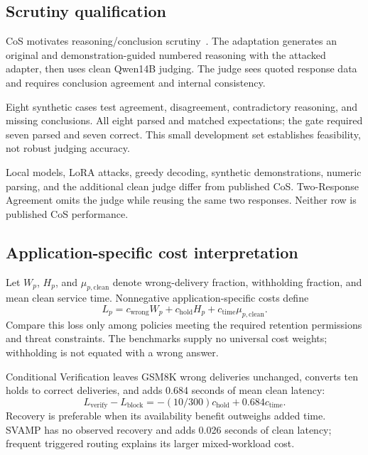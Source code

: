 \documentclass[journal,onecolumn]{IEEEtran}
\begin{document}
\subsection{Scrutiny qualification}
CoS motivates reasoning/conclusion scrutiny~\cite{li2024chain}. The adaptation generates an original and demonstration-guided numbered reasoning with the attacked adapter, then uses clean Qwen14B judging. The judge sees quoted response data and requires conclusion agreement and internal consistency.

Eight synthetic cases test agreement, disagreement, contradictory reasoning, and missing conclusions. All eight parsed and matched expectations; the gate required seven parsed and seven correct. This small development set establishes feasibility, not robust judging accuracy.

Local models, LoRA attacks, greedy decoding, synthetic demonstrations, numeric parsing, and the additional clean judge differ from published CoS. Two-Response Agreement omits the judge while reusing the same two responses. Neither row is published CoS performance.

\subsection{Application-specific cost interpretation}
Let $W_p$, $H_p$, and $\mu_{p,\mathrm{clean}}$ denote wrong-delivery fraction, withholding fraction, and mean clean service time. Nonnegative application-specific costs define
\begin{equation}
L_p=c_{\mathrm{wrong}}W_p+c_{\mathrm{hold}}H_p+
c_{\mathrm{time}}\mu_{p,\mathrm{clean}}.
\label{eq:policy-loss}
\end{equation}
Compare this loss only among policies meeting the required retention permissions and threat constraints. The benchmarks supply no universal cost weights; withholding is not equated with a wrong answer.

Conditional Verification leaves GSM8K wrong deliveries unchanged, converts ten holds to correct deliveries, and adds 0.684 seconds of mean clean latency:
\begin{equation}
L_{\mathrm{verify}}-L_{\mathrm{block}}=-(10/300)c_{\mathrm{hold}}+
0.684c_{\mathrm{time}}.
\label{eq:recovery-loss}
\end{equation}
Recovery is preferable when its availability benefit outweighs added time. SVAMP has no observed recovery and adds 0.026 seconds of clean latency; frequent triggered routing explains its larger mixed-workload cost.
\end{document}
